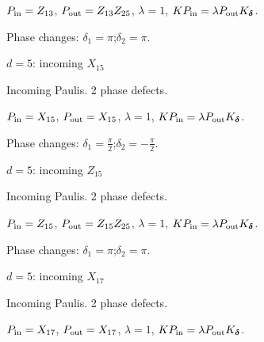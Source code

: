 \vspace{-1mm}
$P_{\rm in}=Z_{13}$, \quad $P_{\rm out}=Z_{13}Z_{25}$, \quad $\lambda=1$, \qquad $K P_{\rm in}=\lambda P_{\rm out}K_{\boldsymbol\delta}$.
\par\smallskip\begin{minipage}{.98\linewidth}\small Phase changes: $\delta_{1}=\pi$;\quad $\delta_{2}=\pi$.\end{minipage}
\vfill
{\footnotesize\texttt{}}
\newpage
{}
{\Large $d=5$: incoming $X_{15}$}\par
Incoming Paulis. 2 phase defects.
\begin{center}
\end{center}
\vspace{-1mm}
$P_{\rm in}=X_{15}$, \quad $P_{\rm out}=X_{15}$, \quad $\lambda=1$, \qquad $K P_{\rm in}=\lambda P_{\rm out}K_{\boldsymbol\delta}$.
\par\smallskip\begin{minipage}{.98\linewidth}\small Phase changes: $\delta_{1}=\frac{\pi}{2}$;\quad $\delta_{2}=-\frac{\pi}{2}$.\end{minipage}
\vfill
{\footnotesize\texttt{}}
\newpage
{}
{\Large $d=5$: incoming $Z_{15}$}\par
Incoming Paulis. 2 phase defects.
\begin{center}
\end{center}
\vspace{-1mm}
$P_{\rm in}=Z_{15}$, \quad $P_{\rm out}=Z_{15}Z_{25}$, \quad $\lambda=1$, \qquad $K P_{\rm in}=\lambda P_{\rm out}K_{\boldsymbol\delta}$.
\par\smallskip\begin{minipage}{.98\linewidth}\small Phase changes: $\delta_{1}=\pi$;\quad $\delta_{2}=\pi$.\end{minipage}
\vfill
{\footnotesize\texttt{}}
\newpage
{}
{\Large $d=5$: incoming $X_{17}$}\par
Incoming Paulis. 2 phase defects.
\begin{center}
\end{center}
\vspace{-1mm}
$P_{\rm in}=X_{17}$, \quad $P_{\rm out}=X_{17}$, \quad $\lambda=1$, \qquad $K P_{\rm in}=\lambda P_{\rm out}K_{\boldsymbol\delta}$.

